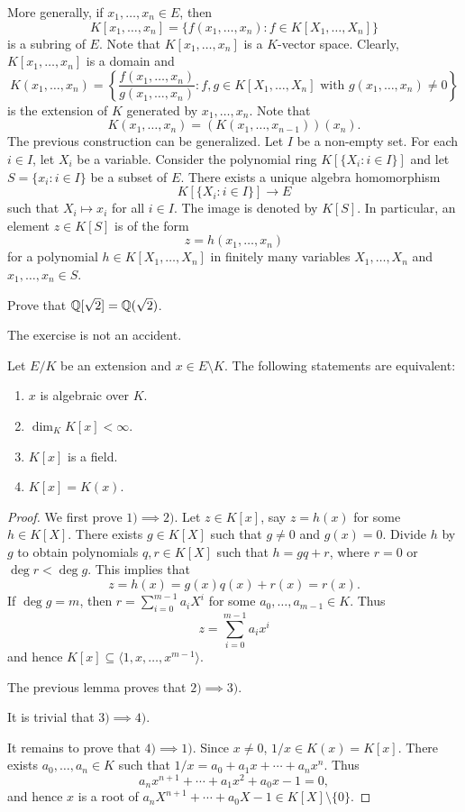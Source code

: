 More generally,
if $x_1,\dots,x_n\in E$, then
\[
K[x_1,\dots,x_n]=\{f(x_1,\dots,x_n):f\in K[X_1,\dots,X_n]\}
\]
is a subring of $E$. 
Note that $K[x_1,\dots,x_n]$ is a $K$-vector space. 
Clearly, $K[x_1,\dots,x_n]$ is a domain
and 
\[
K(x_1,\dots,x_n)=\left\{\frac{f(x_1,\dots,x_n)}{g(x_1,\dots,x_n)}:f,g\in K[X_1,\dots,X_n]\text{ with $g(x_1,\dots,x_n)\ne 0$}\right\}
\]
is the extension of $K$ generated by $x_1,\dots,x_n$. 
Note that 
\[
K(x_1,\dots,x_n)=(K(x_1,\dots,x_{n-1}))(x_n).
\]
The previous construction
can be generalized. Let $I$ be a non-empty set. 
For each $i\in I$, let $X_i$ be a variable. Consider
the polynomial ring $K[\{X_i:i\in I\}]$ and let 
$S=\{x_i:i\in I\}$ be a subset of $E$. There exists a unique 
algebra homomorphism 
\[
K[\{X_i:i\in I\}]\to E
\]
such that $X_i\mapsto x_i$ for all $i\in I$. The image 
is denoted by $K[S]$. In particular, an element $z\in K[S]$ 
is of the form 
\[
z=h(x_1,\dots,x_n)
\]
for a polynomial $h\in K[X_1,\dots,X_n]$ 
in finitely many variables $X_1,\dots,X_n$ and 
$x_1,\dots,x_n\in S$. 

\begin{exercise}
\label{xca: Q[sqrt2]=Q(sqrt2)}
    Prove that $\mathbb{Q}[\sqrt{2}]=\mathbb{Q}(\sqrt{2})$. 
\end{exercise}

The exercise is not an accident. 

\begin{theorem}
\label{thm:simple extesnions}
	Let $E/K$ be an extension and $x\in E\setminus K$.
	The following statements are equivalent:
	\begin{enumerate}
		\item $x$ is algebraic over $K$.
		\item $\dim_KK[x]<\infty$.
		\item $K[x]$ is a field.
		\item $K[x]=K(x)$. 
	\end{enumerate}
\end{theorem}

\begin{proof}
	We first prove $1)\implies 2)$. Let $z\in K[x]$, say $z=h(x)$ for some $h\in K[X]$. There exists
	$g\in K[X]$ such that $g\ne 0$ and $g(x)=0$. Divide $h$ by $g$ to obtain 
	polynomials $q,r\in K[X]$ such that $h=gq+r$, where $r=0$ or $\deg r<\deg g$. This implies that
	\[
		z=h(x)=g(x)q(x)+r(x)=r(x).
	\]
	If $\deg g=m$, then $r=\sum_{i=0}^{m-1}a_iX^i$ for some $a_0,\dots,a_{m-1}\in K$. Thus
	\[
 z=\sum_{i=0}^{m-1}a_ix^i 
 \]
 and hence $K[x]\subseteq\langle 1,x,\dots,x^{m-1}\rangle$. 

	The previous lemma proves that $2)\implies 3)$. 

	It is trivial that $3)\implies 4)$. 

	It remains to prove that $4)\implies 1)$. 
	Since $x\ne 0$, $1/x\in K(x)=K[x]$. There exists $a_0,\dots,a_n\in K$ such that
	$1/x=a_0+a_1x+\cdots+a_nx^n$. Thus
	\[
		a_nx^{n+1}+\cdots+a_1x^2+a_0x-1=0, 
	\]
	and hence $x$ is a root of $a_nX^{n+1}+\cdots+a_0X-1\in K[X]\setminus\{0\}$. 
\end{proof}

